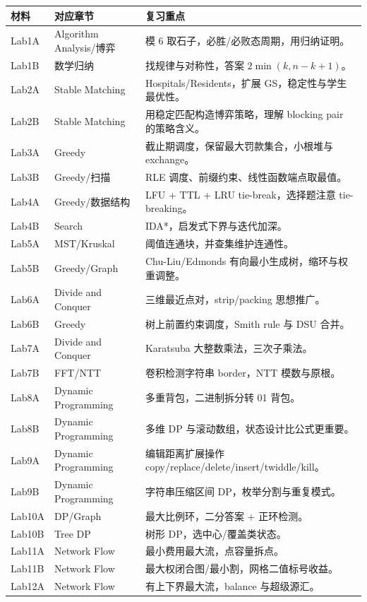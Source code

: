 \documentclass[UTF8,a4paper,11pt]{ctexart}
\begin{document}
\begin{longtable}{p{2.6cm}p{4.1cm}p{7.8cm}}
\toprule
材料 & 对应章节 & 复习重点\\
\midrule
\endhead
Lab1A & Algorithm Analysis/博弈 & 模 $6$ 取石子，必胜/必败态周期，用归纳证明。\\
Lab1B & 数学归纳 & 找规律与对称性，答案 $2\min(k,n-k+1)$。\\
Lab2A & Stable Matching & Hospitals/Residents，扩展 GS，稳定性与学生最优性。\\
Lab2B & Stable Matching & 用稳定匹配构造博弈策略，理解 blocking pair 的策略含义。\\
Lab3A & Greedy & 截止期调度，保留最大罚款集合，小根堆与 exchange。\\
Lab3B & Greedy/扫描 & RLE 调度、前缀约束、线性函数端点取最值。\\
Lab4A & Greedy/数据结构 & LFU + TTL + LRU tie-break，选择题注意 tie-breaking。\\
Lab4B & Search & IDA*，启发式下界与迭代加深。\\
Lab5A & MST/Kruskal & 阈值连通块，并查集维护连通性。\\
Lab5B & Greedy/Graph & Chu-Liu/Edmonds 有向最小生成树，缩环与权重调整。\\
Lab6A & Divide and Conquer & 三维最近点对，strip/packing 思想推广。\\
Lab6B & Greedy & 树上前置约束调度，Smith rule 与 DSU 合并。\\
Lab7A & Divide and Conquer & Karatsuba 大整数乘法，三次子乘法。\\
Lab7B & FFT/NTT & 卷积检测字符串 border，NTT 模数与原根。\\
Lab8A & Dynamic Programming & 多重背包，二进制拆分转 01 背包。\\
Lab8B & Dynamic Programming & 多维 DP 与滚动数组，状态设计比公式更重要。\\
Lab9A & Dynamic Programming & 编辑距离扩展操作 copy/replace/delete/insert/twiddle/kill。\\
Lab9B & Dynamic Programming & 字符串压缩区间 DP，枚举分割与重复模式。\\
Lab10A & DP/Graph & 最大比例环，二分答案 + 正环检测。\\
Lab10B & Tree DP & 树形 DP，选中心/覆盖类状态。\\
Lab11A & Network Flow & 最小费用最大流，点容量拆点。\\
Lab11B & Network Flow & 最大权闭合图/最小割，网格二值标号收益。\\
Lab12A & Network Flow & 有上下界最大流，balance 与超级源汇。\\

\end{longtable}
\end{document}

